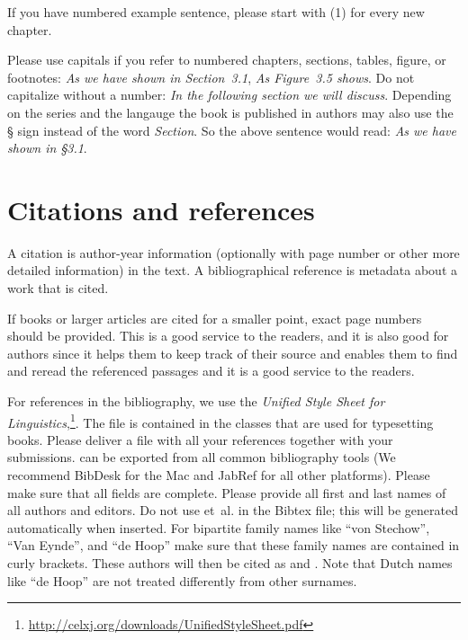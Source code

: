 \begin{enumerate}
If you have numbered example sentence, please start with (1) for every new chapter.

Please use capitals if you refer to numbered chapters, sections, tables, figure, or footnotes: \emph{As we have shown in
  Section~3.1}, \emph{As Figure~3.5 shows}. Do not capitalize without a number: \emph{In the
  following section we will discuss}.
Depending on the series and the langauge the book is published in authors may also use the § sign
instead of the word \emph{Section}. So the above sentence would read: \emph{As we have shown in
  §3.1}.

\section{Citations and references}
\label{sec-references-authors}

A citation is author-year information (optionally with page number or other more detailed information) in the text. A bibliographical reference is metadata about a work that is cited.

If books or larger articles are cited for a smaller point, exact page numbers should be provided. This is a good service to the readers, and it is also good for
authors since it helps them to keep track of their source and enables them to find and reread the
referenced passages and it is a good service to the readers.

For references in the bibliography, we use the \emph{Unified Style Sheet for Linguistics},\footnote{\url{http://celxj.org/downloads/UnifiedStyleSheet.pdf}}. The \bibtex file is contained in the \latex
classes that are used for typesetting \lsp books. 
Please deliver a \bibtex file with all your references together with your submissions. 
\bibtex can be exported from all common bibliography tools (We recommend BibDesk for the Mac and JabRef for all other platforms). 
Please make sure that all \bibtex fields are complete. %
Please provide all first and last names of all authors and editors. Do not use et~al. in the Bibtex file; this will be generated automatically when inserted.
For bipartite family names like ``von Stechow'', ``Van Eynde'', and ``de Hoop'' make sure that these
family names are contained in curly brackets. These authors will then be cited as
\citet{VanEynde2006a} and \citet{vonStechow84a}. Note that Dutch names like ``de Hoop'' are not treated differently from other surnames.


\end{enumerate}

